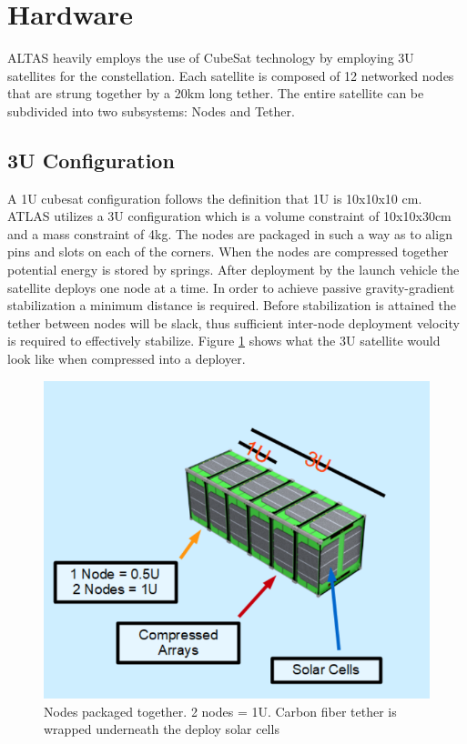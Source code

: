 \documentclass{article}
\begin{document}
\section{Hardware}
ALTAS heavily employs the use of CubeSat technology by employing 3U satellites for the constellation. Each satellite is composed of 12 networked nodes that are strung together by a 20km long tether. The entire satellite can be subdivided into two subsystems: Nodes and Tether.

\subsection{3U Configuration}
A 1U cubesat configuration follows the definition that 1U is 10x10x10 cm. ATLAS utilizes a 3U configuration which is a volume constraint of 10x10x30cm and a mass constraint of 4kg. The nodes are packaged in such a way as to align pins and slots on each of the corners. When the nodes are compressed together potential energy is stored by springs. After deployment by the launch vehicle the satellite deploys one node at a time. In order to achieve passive gravity-gradient stabilization a minimum distance is required. Before stabilization is attained the tether between nodes will be slack, thus sufficient inter-node deployment velocity is required to effectively stabilize. Figure \ref{fig:node_package} shows what the 3U satellite would look like when compressed into a deployer. 

\begin{figure}[H]
  \centering
    \includegraphics[width=.8\linewidth]{figures/packaged}
    \caption{Nodes packaged together. 2 nodes = 1U. Carbon fiber tether is wrapped underneath the deploy solar cells}
\label{fig:node_package}
\end{figure}
\end{document}
